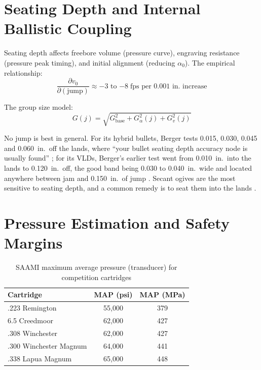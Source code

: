 \documentclass[11pt,twoside,openright]{report}
\begin{document}
\section{Seating Depth and Internal Ballistic Coupling}

Seating depth affects freebore volume (pressure curve), engraving resistance (pressure peak timing), and initial alignment (reducing $\alpha_0$). The empirical relationship:
\begin{equation}
  \frac{\partial v_0}{\partial (\text{jump})} \approx -3 \text{ to } {-8}\;\text{fps per 0.001 in.\ increase}
  \label{eq:jump_vel}
\end{equation}

The group size model:
\begin{equation}
  G(j) = \sqrt{G_{\mathrm{base}}^2 + G_{\alpha}^2(j) + G_v^2(j)}
  \label{eq:group_model}
\end{equation}

No jump is best in general. For its hybrid bullets, Berger tests 0.015, 0.030, 0.045 and 0.060~in.\ off the lands, where ``your bullet seating depth accuracy node is usually found'' \citep{hoham2021hybrid}; for its VLDs, Berger's earlier test went from 0.010~in.\ into the lands to 0.120~in.\ off, the good band being 0.030 to 0.040~in.\ wide and located anywhere between jam and 0.150~in.\ of jump \citep{stecker2009vld}. Secant ogives are the most sensitive to seating depth, and a common remedy is to seat them into the lands \citep[p.~341]{litz2015applied}.

\section{Pressure Estimation and Safety Margins}

\begin{table}[H]
\centering
\caption{SAAMI maximum average pressure (transducer) for competition cartridges \citep{saami2025z2994}}
\label{tab:saami_map}
\begin{tabular}{@{}lcc@{}}
\toprule
\textbf{Cartridge} & \textbf{MAP (psi)} & \textbf{MAP (MPa)} \\
\midrule
.223 Remington & 55,000 & 379 \\
6.5 Creedmoor & 62,000 & 427 \\
.308 Winchester & 62,000 & 427 \\
.300 Winchester Magnum & 64,000 & 441 \\
.338 Lapua Magnum & 65,000 & 448 \\
\bottomrule
\end{tabular}
\end{table}
\end{document}
